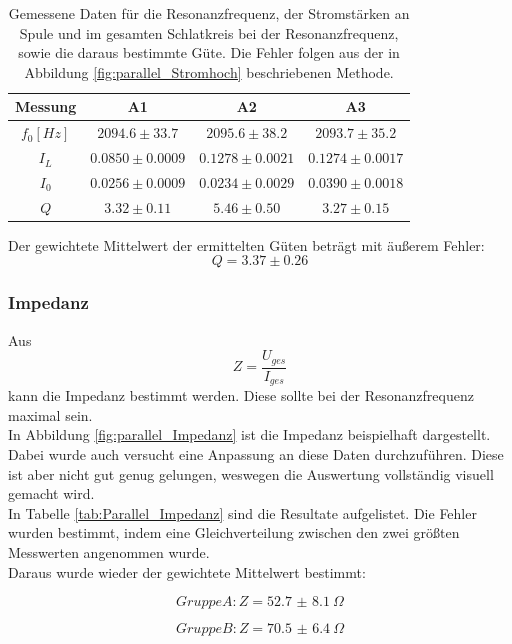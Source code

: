 \documentclass[12pt,a4paper]{article}
\begin{document}
\begin{table}
\centering
\begin{tabular}{|c|c|c|c|}
\hline
Messung & A1 & A2 & A3\\
\hline
$f_0[Hz]$ & $2094.6\pm 33.7$ & $2095.6\pm 38.2$ & $2093.7\pm 35.2$\\
\hline
$I_L$ & $0.0850\pm 0.0009$ & $0.1278\pm 0.0021$ & $0.1274\pm 0.0017$ \\
\hline
$I_0$ & $0.0256\pm 0.0009$ & $0.0234\pm 0.0029$ & $0.0390\pm 0.0018$ \\
\hline
$Q$ & $3.32\pm 0.11$ & $5.46\pm 0.50$ & $3.27\pm 0.15$ \\
\hline
\end{tabular}
\label{tab:Stromhoch_Rohdaten}
\caption{Gemessene Daten für die Resonanzfrequenz, der Stromstärken an Spule und im gesamten Schlatkreis bei der Resonanzfrequenz, sowie die daraus bestimmte Güte. Die Fehler folgen aus der in Abbildung \ref{fig:parallel_Stromhoch} beschriebenen Methode.}
\end{table}
Der gewichtete Mittelwert der ermittelten Güten beträgt mit äußerem Fehler:
\begin{equation}
Q = 3.37\pm 0.26 
\end{equation}

\subsubsection{Impedanz}
Aus
\begin{equation}
Z = \dfrac{U_{ges}}{I_{ges}}
\end{equation}
kann die Impedanz bestimmt werden. Diese sollte bei der Resonanzfrequenz maximal sein.\\
In Abbildung \ref{fig:parallel_Impedanz} ist die Impedanz beispielhaft dargestellt. Dabei wurde auch versucht eine Anpassung an diese Daten durchzuführen. Diese ist aber nicht gut genug gelungen, weswegen die Auswertung vollständig visuell gemacht wird.\\
In Tabelle \ref{tab:Parallel_Impedanz} sind die Resultate aufgelistet. Die Fehler wurden bestimmt, indem eine Gleichverteilung zwischen den zwei größten Messwerten angenommen wurde.\\
Daraus wurde wieder der gewichtete Mittelwert bestimmt:

\begin{equation}
Gruppe A: Z = \SI{52.7(81)}{\Omega}
\end{equation}

\begin{equation}
Gruppe B: Z = \SI{70.5(64)}{\Omega}
\end{equation}
\end{document}
